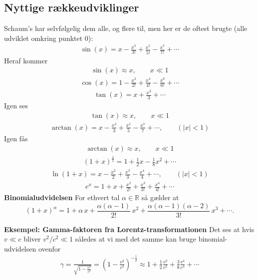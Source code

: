 \documentclass[a4paper]{article}
\begin{document}
    \subsection{Nyttige rækkeudviklinger}
    Schaum's har selvfølgelig dem alle, og flere til, men her er de oftest brugte (alle udviklet omkring punktet \(0\)):
    \begin{align*}
        \sin (x) = x - \frac{x^3}{3!} + \frac{x^5}{5!} - \frac{x^7}{7!} + \cdots
    \end{align*} 
    Heraf kommer \begin{align*}
        \sin (x) \approx x, \qquad x \ll 1
    \end{align*}
    \begin{align*}
        \cos (x) = 1 - \frac{x^{2} }{2!} + \frac{x^4}{4!} - \frac{x^6}{6!} + \cdots
    \end{align*}
    \begin{align*}
        \tan (x) = x + \frac{x^3}{3} + \cdots
    \end{align*}
    Igen ses \begin{align*}
        \tan (x) \approx x, \qquad x \ll 1
    \end{align*}
    \begin{align*}
        \arctan(x) = x - \frac{x^3}{3} + \frac{x^5}{5} - \frac{x^7}{7} + \cdots, \qquad (\left| x \right| < 1)
    \end{align*}
    Igen fås \begin{align*}
        \arctan(x) \approx x, \qquad x \ll 1
    \end{align*}
    \begin{align*}
        \left( 1 + x \right)^{\frac{1}{2}} = 1 + \frac{1}{2}x - \frac{1}{8}x^2 + \cdots
    \end{align*}
    \begin{align*}
        \ln(1 + x) = x - \frac{x^{2} }{2} + \frac{x^3}{3} - \frac{x^4}{4} + \cdots, \qquad (\left| x \right| < 1 )
    \end{align*}
    \begin{align*}
        e^x = 1 + x + \frac{x^2}{2!} + \frac{x^3}{3!} + \frac{x^4}{4!} + \cdots
    \end{align*}
    \textbf{Binomialudvidelsen}
    For ethvert tal \(\alpha \in \mathbb{R}\) så gælder at  
    \[
    (1 + x)^\alpha
    = 1
    + \alpha\,x
    + \frac{\alpha(\alpha - 1)}{2!}\,x^2
    + \frac{\alpha(\alpha - 1)(\alpha - 2)}{3!}\,x^3
    + \cdots.
    \]

    \textbf{Eksempel: Gamma-faktoren fra Lorentz-transformationen} 
    Det ses at hvis \(v \ll c\) bliver \(v^{2} / c^{2}  \ll 1\) således at vi med det samme kan bruge binomial-udvidelsen ovenfor 
    \begin{align*}
        \gamma = \frac{1}{\sqrt{1 - \frac{v^2}{c^2}}} = \left( 1 - \frac{v^2}{c^2} \right)^{-\frac{1}{2}} \approx 1 + \frac{1}{2}\frac{v^{2}}{c^{2} } + \frac{3}{8} \frac{v^4}{c^4} + \cdots
    \end{align*}
\end{document}

